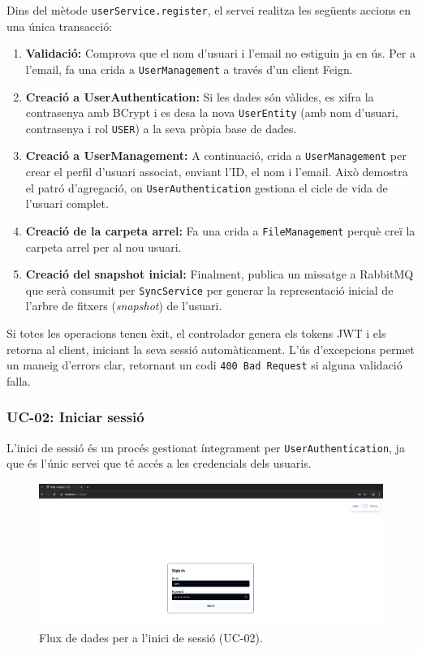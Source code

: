 Dins del mètode \texttt{userService.register}, el servei realitza les següents accions en una única transacció:
\begin{enumerate}
    \item \textbf{Validació:} Comprova que el nom d'usuari i l'email no estiguin ja en ús. Per a l'email, fa una crida a \texttt{UserManagement} a través d'un client Feign.
    \item \textbf{Creació a UserAuthentication:} Si les dades són vàlides, es xifra la contrasenya amb BCrypt i es desa la nova \texttt{UserEntity} (amb nom d'usuari, contrasenya i rol \texttt{USER}) a la seva pròpia base de dades.
    \item \textbf{Creació a UserManagement:} A continuació, crida a \texttt{UserManagement} per crear el perfil d'usuari associat, enviant l'ID, el nom i l'email. Això demostra el patró d'agregació, on \texttt{UserAuthentication} gestiona el cicle de vida de l'usuari complet.
    \item \textbf{Creació de la carpeta arrel:} Fa una crida a \texttt{FileManagement} perquè creï la carpeta arrel per al nou usuari.
    \item \textbf{Creació del snapshot inicial:} Finalment, publica un missatge a RabbitMQ que serà consumit per \texttt{SyncService} per generar la representació inicial de l'arbre de fitxers (\textit{snapshot}) de l'usuari.
\end{enumerate}
Si totes les operacions tenen èxit, el controlador genera els tokens JWT i els retorna al client, iniciant la seva sessió automàticament. L'ús d'excepcions permet un maneig d'errors clar, retornant un codi \texttt{400 Bad Request} si alguna validació falla.

\subsubsection{UC-02: Iniciar sessió}

L'inici de sessió és un procés gestionat íntegrament per \texttt{UserAuthentication}, ja que és l'únic servei que té accés a les credencials dels usuaris.

\begin{figure}[H]
    \centering
    \includegraphics[width=1\textwidth]{Figures/ui-web/login.png}
    \caption{Flux de dades per a l'inici de sessió (UC-02).}
\end{figure}


